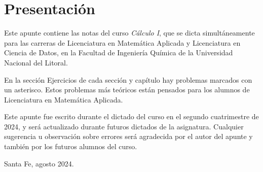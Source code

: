 \chapter*{Presentación}
Este apunte contiene las notas del curso \emph{Cálculo I}, que se dicta simultáneamente para las carreras de Licenciatura en Matemática Aplicada y Licenciatura en Ciencia
de Datos, en la Facultad de Ingeniería Química de la Universidad Nacional
del Litoral.

En la sección Ejercicios de cada sección y capítulo hay problemas marcados con un asterisco. Estos problemas más teóricos están pensados para los alumnos de Licenciatura en Matemática Aplicada.

\bigskip

Este apunte fue escrito durante el dictado del curso en el segundo cuatrimestre de 2024, y será actualizado durante futuros dictados de la asignatura.
Cualquier sugerencia u observación sobre errores será agradecida por el autor del apunte y también por los futuros alumnos del curso.

\bigskip
\bigskip
\bigskip

\hfil\hfil\hfil Santa Fe, agosto 2024.
